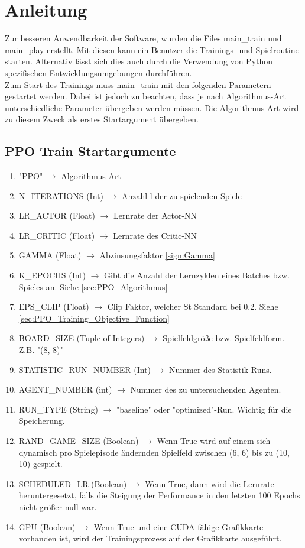 \chapter{Anleitung}
Zur besseren Anwendbarkeit der Software, wurden die Files main\_train und main\_play erstellt. Mit diesen kann ein Benutzer die Trainings- und Spielroutine starten. Alternativ lässt sich dies auch durch die Verwendung von Python spezifischen Entwicklungsumgebungen durchführen.\\
Zum Start des Trainings muss  main\_train mit den folgenden Parametern gestartet werden. Dabei ist jedoch zu beachten, dass je nach Algorithmus-Art unterschiedliche Parameter übergeben werden müssen. Die Algorithmus-Art wird zu diesem Zweck als erstes Startargument übergeben.

\section{PPO Train Startargumente} \label{sec:Anleitung_PPO_Train_Startargumente}
\begin{enumerate}
	\item "PPO" $\longrightarrow$ Algorithmus-Art
	\item N\_ITERATIONS (Int) $\longrightarrow$ Anzahl l der zu spielenden Spiele
	\item LR\_ACTOR (Float) $\longrightarrow$ Lernrate der Actor-NN
	\item LR\_CRITIC (Float) $\longrightarrow$ Lernrate des Critic-NN
	\item GAMMA (Float) $\longrightarrow$ Abzinsungsfaktor \ref{sign:Gamma}
	\item K\_EPOCHS (Int) $\longrightarrow$ Gibt die Anzahl der  Lernzyklen eines Batches bzw. Spieles an. Siehe \ref{sec:PPO_Algorithmus}
	\item EPS\_CLIP (Float) $\longrightarrow$ Clip Faktor, welcher St Standard bei 0.2. Siehe \ref{sec:PPO_Training_Objective_Function}
	\item BOARD\_SIZE (Tuple of Integers) $\longrightarrow$ Spielfeldgröße bzw. Spielfeldform. Z.B. "(8, 8)"
	\item STATISTIC\_RUN\_NUMBER (Int) $\longrightarrow$ Nummer des Statistik-Runs.
	\item AGENT\_NUMBER (int) $\longrightarrow$ Nummer des zu untersuchenden Agenten.
	\item RUN\_TYPE (String) $\longrightarrow$ "baseline" oder "optimized"-Run. Wichtig für die Speicherung.
	\item RAND\_GAME\_SIZE (Boolean) $\longrightarrow$ Wenn True wird auf einem sich dynamisch pro Spielepisode ändernden Spielfeld zwischen (6, 6) bis zu (10, 10) gespielt.
	\item SCHEDULED\_LR (Boolean) $\longrightarrow$ Wenn True, dann wird die Lernrate heruntergesetzt, falls die Steigung der Performance in den letzten 100 Epochs nicht größer null war.
	\item GPU (Boolean) $\longrightarrow$ Wenn True und eine CUDA-fähige Grafikkarte vorhanden ist, wird der Trainingsprozess auf der Grafikkarte ausgeführt.
\end{enumerate}
